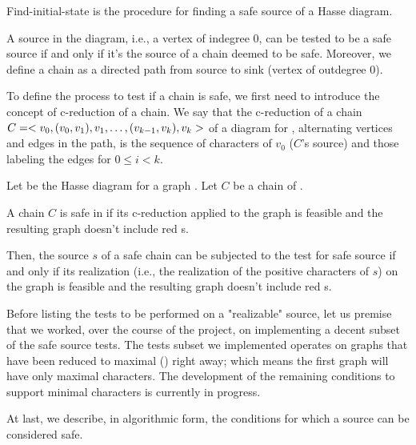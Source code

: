 Find-initial-state is the procedure for finding a safe source of a Hasse diagram.

A source in the diagram, i.e., a vertex of indegree 0, can be tested to be a safe source if and only if it's the source of a chain deemed to be safe.
Moreover, we define a chain as a directed path from source to sink (vertex of outdegree 0).

To define the process to test if a chain is safe, we first need to introduce the concept of c-reduction of a chain.
We say that the c-reduction of a chain $C = < v_{0}, (v_{0}, v_{1}), v_{1}, \dots, (v_{k-1}, v_{k}), v_{k} >$ of a diagram \hasse{} for \gm{}, alternating vertices and edges in the path, is the sequence of characters of $v_{0}$ ($C$'s source) and those labeling the edges  for $0 \leq i < k$.

\begin{definition}\label{definition:safe-chain}
  Let \hasse{} be the Hasse diagram for a graph \gm{}.
  Let $C$ be a chain of \hasse{}.

  A chain $C$ is safe in \hasse{} if its c-reduction applied to the graph \gm{} is feasible and the resulting graph doesn't include red \sg{}s.
\end{definition}

Then, the source $s$ of a safe chain can be subjected to the test for safe source if and only if its realization (i.e., the realization of the positive characters of $s$) on the graph \grb{} is feasible and the resulting graph doesn't include red \sg{}s.

Before listing the tests to be performed on a "realizable" source, let us premise that we worked, over the course of the project, on implementing a decent subset of the safe source tests.
The tests subset we implemented operates on graphs that have been reduced to maximal (\grbcm{}) right away; which means the first graph \grb{} will have only maximal characters.
The development of the remaining conditions to support minimal characters is currently in progress.

At last, we describe, in algorithmic form, the conditions for which a source can be considered safe.

